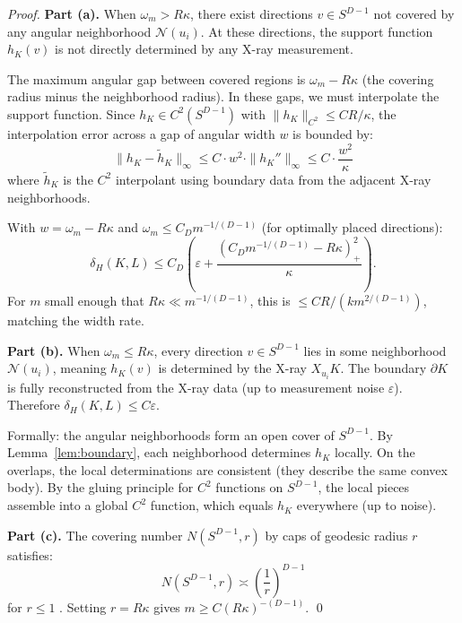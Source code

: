 \begin{proof}
\textbf{Part (a).} When $\omega_m > R\kappa$, there exist directions $v \in S^{D-1}$ not covered by any angular neighborhood $\mathcal{N}(u_i)$. At these directions, the support function $h_K(v)$ is not directly determined by any X-ray measurement.

The maximum angular gap between covered regions is $\omega_m - R\kappa$ (the covering radius minus the neighborhood radius). In these gaps, we must interpolate the support function. Since $h_K \in C^2(S^{D-1})$ with $\|h_K\|_{C^2} \leq CR/\kappa$, the interpolation error across a gap of angular width $w$ is bounded by:
\[
  \|h_K - \tilde{h}_K\|_\infty \leq C \cdot w^2 \cdot \|h_K''\|_\infty \leq C \cdot \frac{w^2}{\kappa}
\]
where $\tilde{h}_K$ is the $C^2$ interpolant using boundary data from the adjacent X-ray neighborhoods.

With $w = \omega_m - R\kappa$ and $\omega_m \leq C_D m^{-1/(D-1)}$ (for optimally placed directions):
\[
  \delta_H(K, L) \leq C_D\!\left(\varepsilon + \frac{(C_D m^{-1/(D-1)} - R\kappa)_+^2}{\kappa}\right).
\]
For $m$ small enough that $R\kappa \ll m^{-1/(D-1)}$, this is $\leq C R/(k m^{2/(D-1)})$, matching the width rate.

\textbf{Part (b).} When $\omega_m \leq R\kappa$, every direction $v \in S^{D-1}$ lies in some neighborhood $\mathcal{N}(u_i)$, meaning $h_K(v)$ is determined by the X-ray $X_{u_i} K$. The boundary $\partial K$ is fully reconstructed from the X-ray data (up to measurement noise $\varepsilon$). Therefore $\delta_H(K, L) \leq C \varepsilon$.

Formally: the angular neighborhoods form an open cover of $S^{D-1}$. By Lemma~\ref{lem:boundary}, each neighborhood determines $h_K$ locally. On the overlaps, the local determinations are consistent (they describe the same convex body). By the gluing principle for $C^2$ functions on $S^{D-1}$, the local pieces assemble into a global $C^2$ function, which equals $h_K$ everywhere (up to noise).

\textbf{Part (c).} The covering number $N(S^{D-1}, r)$ by caps of geodesic radius $r$ satisfies:
\[
  N(S^{D-1}, r) \asymp \left(\frac{1}{r}\right)^{D-1}
\]
for $r \leq 1$ \cite{rogers1963covering}. Setting $r = R\kappa$ gives $m \geq C (R\kappa)^{-(D-1)}$. \qed
\end{proof}


